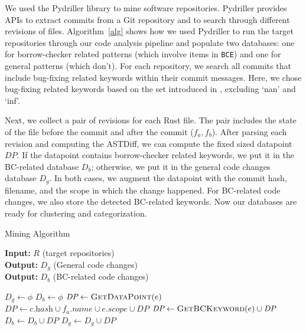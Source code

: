 We used the Pydriller library to mine software repositories. Pydriller provides APIs to extract commits from a Git repository and to search through different revisions of files. Algorithm~\ref{alg} shows how we used Pydriller to run the target repositories through our code analysis pipeline and populate two databases: one for borrow-checker related patterns (which involve items in \texttt{BCE}) and one for general patterns (which don't). For each repository, we search all commits that include bug-fixing related keywords within their commit messages. Here, we chose bug-fixing related keywords based on the set introduced in \cite{zhang2018empirical}, excluding `nan' and `inf'. 


Next, we collect a pair of revisions for each Rust file. The pair includes the state of the file before the commit and after the commit ($f_a, f_b$). After parsing each revision and computing the ASTDiff, we can compute the fixed sized datapoint $\mathit{DP}$. If the datapoint contains borrow-checker related keywords, we put it in the BC-related database $D_b$; otherwise, we put it in the general code changes database $D_g$. In both cases, we augment the datapoint with the commit hash, filename, and the scope in which the change happened. For BC-related code changes, we also store the detected BC-related keywords. Now our databases are ready for clustering and categorization.

\begin{algorithm}
\caption{\label{alg} Mining Algorithm}
\hspace*{2mm} \textbf{Input:} $R$ (target repositories)  \\
\hspace*{2mm} \textbf{Output:} $D_g$ (General code changes) \\
\hspace*{2mm} \textbf{Output:} $D_b$ (BC-related code changes)
\begin{algorithmic}
\State $D_g \leftarrow \phi$
\State $D_b \leftarrow \phi$
                    \State $\textit{DP} \leftarrow \textsc{GetDataPoint}(e)$
                    \State $\textit{DP} \leftarrow c.\textit{hash} \cup f_a.\textit{name} \cup e.\textit{scope} \cup \textit{DP} $
                        \State $\textit{DP} \leftarrow \textsc{GetBCKeyword}(e) \cup \textit{DP} $
                        \State $D_b \leftarrow D_b \cup \textit{DP}$
                    \Else
                        \State $D_g \leftarrow D_g \cup \textit{DP}$
                    \EndIf
                \EndFor
            \EndFor
        \EndIf
    \EndFor
\EndFor
\end{algorithmic}
\end{algorithm}

